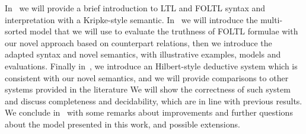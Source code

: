 In~ we will provide a brief introduction to \ac{LTL} and \ac{FOLTL} syntax and interpretation with a
Kripke-style semantic. In~ we will introduce the multi-sorted model that we will use to evaluate
the truthness of \ac{FOLTL} formulae with our novel approach based on counterpart relations, then we introduce the
adapted syntax and novel semantics, with illustrative examples, models and evaluations. Finally in~,
we introduce an Hilbert-style deductive system which is consistent with our novel semantics, and we will provide
comparisons to other systems provided in the literature We will show the correctness of such system and discuss
completeness and decidability, which are in line with previous results.  We conclude in~ with some
remarks about improvements and further questions about the model presented in this work, and possible extensions.
